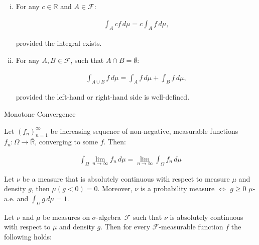 \documentclass[10pt,landscape]{article}
\renewcommand{\geq}{\geqslant}
\newcommand{\SigmaAlgebra}{$\sigma$-algebra}
\newcommand{\CalF}{\mathcal{F}}
\begin{document}
\begin{multicols}{3}
\begin{exercise}{3.6}{}
        \begin{enumerate}[(i)]
            \setlength{\parskip}{0em}
            \item For any $c \in \mathbb{R}$ and $A \in \CalF$:

                \begin{align*}
                    \int_A cf \, d\mu = c \int_A f \, d\mu,
                \end{align*}
            
            provided the integral exists.
            \item For any $A, B \in \CalF$, such that $A \cap B = \emptyset$:

                \begin{align*}
                    \int_{A \cup B} f \,d\mu = \int_{A} f \,d\mu + \int_{B} f \,d\mu,
                \end{align*}

            provided the left-hand or right-hand side is well-defined.
        \end{enumerate}

\end{exercise}

\begin{theorem}{3.8}{Monotone Convergence}

    Let $(f_n)_{n=1}^{\infty}$ be increasing sequence of non-negative, measurable functions $f_n: \Omega \to \overline{\mathbb{R}}$, converging to some $f$. Then:

        \begin{align*}
            \int_{\Omega} \lim_{n \to \infty} f_n \,d\mu = \lim_{n \to \infty} \int_{\Omega} f_n \,d\mu
        \end{align*}

\end{theorem}

\begin{exercise}{3.15}{}

    Let $\nu$ be a measure that is absolutely continuous with respect to measure $\mu$ and density $g$, then $\mu(g < 0) = 0$. Moreover, $\nu$ is a probability measure $\Leftrightarrow$ $g \geq 0$ $\mu$-a.e. and $\int_{\Omega} g \, d\mu = 1$.

\end{exercise}

\begin{proposition}{3.16}{}

    Let $\nu$ and $\mu$ be measures on \SigmaAlgebra\ $\CalF$ such that $\nu$ is absolutely continuous with respect to $\mu$ and density $g$. Then for every $\CalF$-measurable function $f$ the following holds:


\end{proposition}
\end{multicols}
\end{document}
